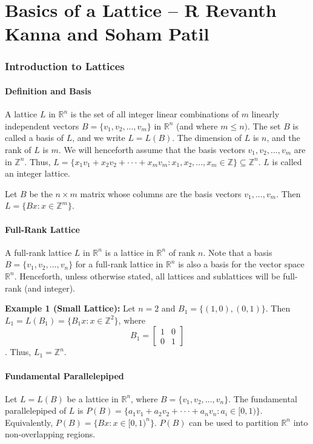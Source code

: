 \documentclass[12pt, a4paper]{article}
\theoremstyle{definition}
\theoremstyle{plain}
\begin{document}
\newpage


\part{Basics of a Lattice -- R Revanth Kanna and Soham Patil}

\section{Introduction to Lattices}

\subsection{Definition and Basis}
A lattice $L$ in $\mathbb{R}^{n}$ is the set of all integer linear combinations of $m$ linearly independent vectors $B=\{v_{1},v_{2},...,v_{m}\}$ in $\mathbb{R}^{n}$ (and where $m\le n)$. The set $B$ is called a basis of $L$, and we write $L=L(B)$. The dimension of $L$ is $n$, and the rank of $L$ is $m$. We will henceforth assume that the basis vectors $v_{1},v_{2},...,v_{m}$ are in $\mathbb{Z}^{n}$. Thus, $L=\{x_{1}v_{1}+x_{2}v_{2}+\cdot\cdot\cdot+x_{m}v_{m}:x_{1},x_{2},...,x_{m}\in\mathbb{Z}\}\subseteq\mathbb{Z}^{n}$. $L$ is called an integer lattice.

Let $B$ be the $n\times m$ matrix whose columns are the basis vectors $v_{1},...,v_{m}$. Then $L=\{Bx:x\in\mathbb{Z}^{m}\}$.

\subsection{Full-Rank Lattice}
A full-rank lattice $L$ in $\mathbb{R}^{n}$ is a lattice in $\mathbb{R}^{n}$ of rank $n$. Note that a basis $B=\{v_{1},v_{2},...,v_{n}\}$ for a full-rank lattice in $\mathbb{R}^{n}$ is also a basis for the vector space $\mathbb{R}^{n}$. Henceforth, unless otherwise stated, all lattices and sublattices will be full-rank (and integer).

\textbf{Example 1 (Small Lattice):}
Let $n=2$ and $B_{1}=\{(1,0),(0,1)\}$. Then $L_{1}=L(B_{1})=\{B_{1}x:x\in\mathbb{Z}^{2}\}$, where
$$B_{1}=\begin{bmatrix}1&0\\ 0&1\end{bmatrix}$$. Thus, $L_{1}=\mathbb{Z}^{n}$.

\subsection{Fundamental Parallelepiped}
Let $L=L(B)$ be a lattice in $\mathbb{R}^{n}$, where $B=\{v_{1},v_{2},...,v_{n}\}$. The fundamental parallelepiped of $L$ is $P(B)=\{a_{1}v_{1}+a_{2}v_{2}+\cdot\cdot\cdot+a_{n}v_{n}:a_{i}\in[0,1)\}$. Equivalently, $P(B)=\{Bx:x\in[0,1)^{n}\}$. $P(B)$ can be used to partition $\mathbb{R}^{n}$ into non-overlapping regions.
\end{document}
